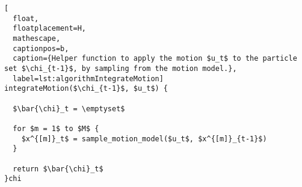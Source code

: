 \begin{lstlisting}[
  float,
  floatplacement=H,
  mathescape,
  captionpos=b,
  caption={Helper function to apply the motion $u_t$ to the particle set $\chi_{t-1}$, by sampling from the motion model.},
  label=lst:algorithmIntegrateMotion]
integrateMotion($\chi_{t-1}$, $u_t$) {

  $\bar{\chi}_t = \emptyset$

  for $m = 1$ to $M$ {
    $x^{[m]}_t$ = sample_motion_model($u_t$, $x^{[m]}_{t-1}$)
  }

  return $\bar{\chi}_t$
}chi\end{lstlisting}

